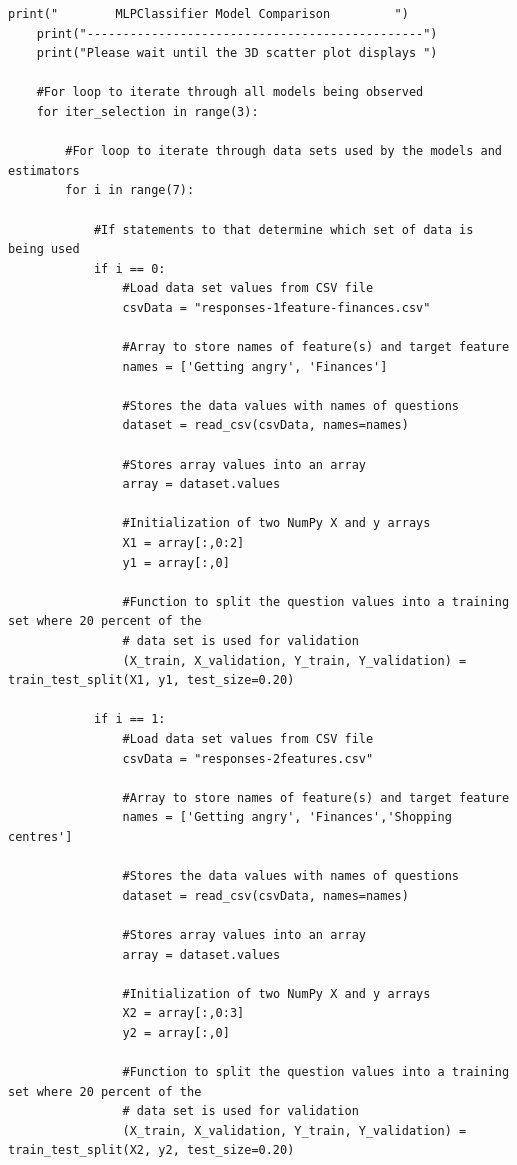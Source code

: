 \documentclass[a4paper, 12pt]{article}
\begin{document}
\begin{lstlisting}[frame = single]
    print("        MLPClassifier Model Comparison         ")
    print("-----------------------------------------------")
    print("Please wait until the 3D scatter plot displays ")

    #For loop to iterate through all models being observed
    for iter_selection in range(3):
  
        #For loop to iterate through data sets used by the models and estimators
        for i in range(7):

            #If statements to that determine which set of data is being used
            if i == 0:
                #Load data set values from CSV file
                csvData = "responses-1feature-finances.csv"
                
                #Array to store names of feature(s) and target feature
                names = ['Getting angry', 'Finances']

                #Stores the data values with names of questions
                dataset = read_csv(csvData, names=names)

                #Stores array values into an array
                array = dataset.values

                #Initialization of two NumPy X and y arrays
                X1 = array[:,0:2]
                y1 = array[:,0]

                #Function to split the question values into a training set where 20 percent of the 
                # data set is used for validation
                (X_train, X_validation, Y_train, Y_validation) = train_test_split(X1, y1, test_size=0.20)

            if i == 1:
                #Load data set values from CSV file
                csvData = "responses-2features.csv"    

                #Array to store names of feature(s) and target feature
                names = ['Getting angry', 'Finances','Shopping centres']
    
                #Stores the data values with names of questions
                dataset = read_csv(csvData, names=names)

                #Stores array values into an array
                array = dataset.values

                #Initialization of two NumPy X and y arrays
                X2 = array[:,0:3]
                y2 = array[:,0]

                #Function to split the question values into a training set where 20 percent of the 
                # data set is used for validation
                (X_train, X_validation, Y_train, Y_validation) = train_test_split(X2, y2, test_size=0.20)


\end{lstlisting}
\end{document}
